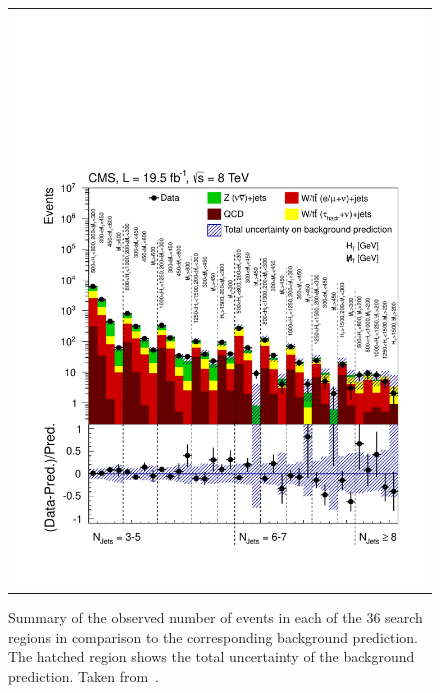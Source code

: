 \begin{figure}[!t]
  \centering
  \begin{tabular}{c}
    \includegraphics[width=0.99\textwidth]{figures/RA2_summary.pdf}
  \end{tabular}
  \caption{Summary of the observed number of events in each of the 36 search regions in comparison to the corresponding background prediction. The hatched region shows the total uncertainty of the background prediction. Taken from~\cite{Chatrchyan:2014lfa}.}
  \label{fig:ra2_summary}
\end{figure}

